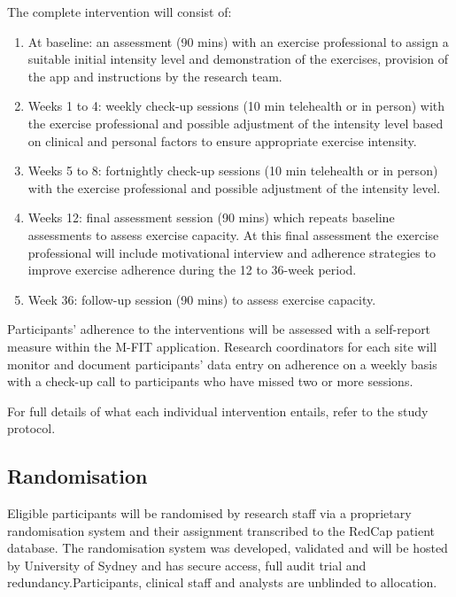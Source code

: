 \documentclass[11pt,parskip=half-]{scrartcl}
\begin{document}
The complete intervention will consist of:

\begin{enumerate}
  \def\labelenumi{\arabic{enumi}.}
  \item At baseline: an assessment (90 mins) with an exercise professional to assign a suitable initial intensity level and demonstration of the exercises, provision of the app and instructions by the research team.
  \item Weeks 1 to 4: weekly check-up sessions (10 min telehealth or in person) with the exercise professional and possible adjustment of the intensity level based on clinical and personal factors to ensure appropriate exercise intensity.
  \item Weeks 5 to 8: fortnightly check-up sessions (10 min telehealth or in person) with the exercise professional and possible adjustment of the intensity level.
  \item Weeks 12: final assessment session (90 mins) which repeats baseline assessments to assess exercise capacity. At this final assessment the exercise professional will include motivational interview and adherence strategies to improve exercise adherence during the 12 to 36-week period.
  \item Week 36: follow-up session (90 mins) to assess exercise capacity.
\end{enumerate}

Participants' adherence to the interventions will be assessed with a self-report measure within the M-FIT application. Research coordinators for each site will monitor and document participants' data entry on adherence on a weekly basis with a check-up call to participants who have missed two or more sessions.

For full details of what each individual intervention entails, refer to the study protocol.

\subsection{Randomisation}\label{randomisation}

Eligible participants will be randomised by research staff via a proprietary randomisation system and their assignment transcribed to the RedCap patient database. The randomisation system was developed, validated and will be hosted by University of Sydney and has secure access, full audit trial and redundancy.Participants, clinical staff and analysts are unblinded to allocation.
\end{document}
